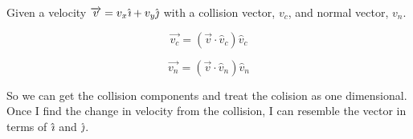 \documentclass{article}
\begin{document}
Given a velocity $\overrightarrow{v} = v_x \hat{\textit{\i}} + v_y \hat{\textit{\j}}$ with a collision vector, $v_c$, and normal vector, $v_n$.

\begin{equation}
    \overrightarrow{v_c} = (\overrightarrow{v} \cdot \widehat{v}_c) \widehat{v}_c
\end{equation}

\begin{equation}
    \overrightarrow{v_n} = (\overrightarrow{v} \cdot \widehat{v}_n) \widehat{v}_n
\end{equation}

So we can get the collision components and treat the colision as one dimensional. 
Once I find the change in velocity from the collision, I can resemble the vector in terms of $\hat{\textit{\i}}$ and $\hat{\textit{\j}}$.
\end{document}
